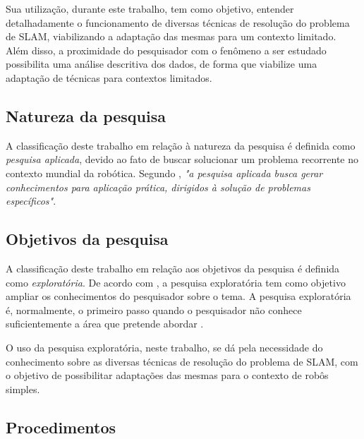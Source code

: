 		Sua utilização, durante este trabalho, tem como objetivo, entender detalhadamente o funcionamento de diversas técnicas de resolução do problema de SLAM, viabilizando a adaptação das mesmas para um contexto limitado. Além disso, a proximidade do pesquisador com o fenômeno a ser estudado possibilita uma análise descritiva dos dados, de forma que viabilize uma adaptação de técnicas para contextos limitados.
		

		\subsection{Natureza da pesquisa} %
		\label{sub:natureza_da_pesquisa}
		
			A classificação deste trabalho em relação à natureza da pesquisa é definida como \textit{pesquisa aplicada}, devido ao fato de buscar solucionar um problema recorrente no contexto mundial da robótica. Segundo \cite{metodologia}, \textit{"a pesquisa aplicada busca gerar conhecimentos para aplicação prática, dirigidos à solução de problemas específicos"}.

		\subsection{Objetivos da pesquisa} %
		\label{sec:classificação_quanto_aos_objetivos_da_pesquisa}
			
			A classificação deste trabalho em relação aos objetivos da pesquisa é definida como \textit{exploratória}. De acordo com \cite{metodologiaCientifica}, a pesquisa exploratória tem como objetivo ampliar os conhecimentos do pesquisador sobre o tema. A pesquisa exploratória é, normalmente, o primeiro passo quando o pesquisador não conhece suficientemente a área que pretende abordar \cite{metodologiaDaPesquisa}.

			O uso da pesquisa exploratória, neste trabalho, se dá pela necessidade do conhecimento sobre as diversas técnicas de resolução do problema de SLAM, com o objetivo de possibilitar adaptações das mesmas para o contexto de robôs simples.

		\subsection{Procedimentos} %
		\label{sub:procedimentos}

